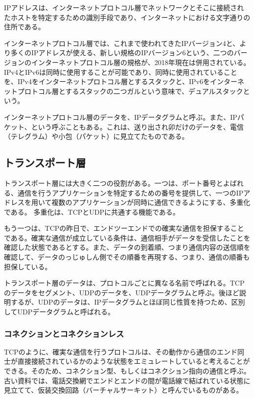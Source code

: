 IPアドレスは、インターネットプロトコル層でネットワークとそこに接続されたホストを特定するための識別手段であり、インターネットにおける文字通りの住所である。

インターネットプロトコル層では、これまで使われてきたIPバージョン4と、より多くのIPアドレスが使える、新しい規格のIPバージョン6という、二つのバージョンのインターネットプロトコル層の規格が、2018年現在は併用されている。IPv4とIPv6は同時に使用することが可能であり、同時に使用されていることを、IPv4をインターネットプロトコル層とするスタックと、IPv6をインターネットプロトコル層とするスタックの二つガルという意味で、デュアルスタックという。

インターネットプロトコル層のデータを、IPデータグラムと呼ぶ。また、IPパケット、という呼ぶこともある。これは、送り出され卯だけのデータを、電信（テレグラム）や小包（パケット）に見立てたものである。

\subsection{トランスポート層}
トランスポート層には大きく二つの役割がある。一つは、ポート番号とよばれる、通信を行うアプリケーションを特定するための番号を提供して、一つのIPアドレスを用いて複数のアプリケーションが同時に通信できるようにする、多重化である。
多重化は、TCPとUDPに共通する機能である。

もう一つは、TCPの昨日で、エンドツーエンドでの確実な通信を担保することである。確実な通信が成立している条件は、通信相手がデータを受信したことを確認した状態であるとする。また、データの到着順、つまり通信内容の送信順を確認して、データのっじゅしん側でその順番を再現する、つまり、通信の順番も担保している。

トランスポート層のデータは、プロトコルごとに異なる名前で呼ばれる。TCPのデータをセグメント、UDPのデータを、UDPデータグラムと呼ぶ。後ほど説明するが、UDPのデータは、IPデータグラムとほぼ同じ性質を持つため、区別してUDPデータグラムと呼ばれる。

\subsubsection{コネクションとコネクションレス}
TCPのように、確実な通信を行うプロトコルは、その動作から通信のエンド同士が直接接続されているかのような状態をエミュレートしていると考えることができる。そのため、コネクション型、もしくはコネクション指向の通信と呼ぶ。古い資料では、電話交換網でエンドとエンドの間が電話線で結ばれている状態に見立てて、仮装交換回路（バーチャルサーキット）と呼んでいるものがある。

